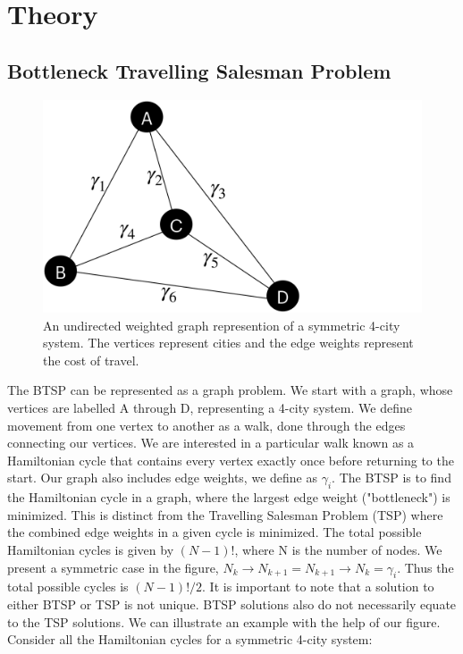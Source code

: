 \documentclass[twocolumn,showpacs,preprintnumbers,amsmath,amssymb]{revtex4}
\begin{document}
		
		\section{Theory}
		
		\subsection{Bottleneck Travelling Salesman Problem}
		
		\begin{figure}[!h]
			\centering
			\includegraphics[trim={0 0 21.9cm 0},clip, width=0.7 \linewidth]{"graphics/4-city"}
			\caption{An undirected weighted graph represention of a  symmetric 4-city system.  The vertices represent cities and the edge weights represent the cost of travel. }
			\label{fig:4-city-graphic}
		\end{figure}		
		
		The BTSP can be represented as a graph problem.  We start with a graph, whose vertices are labelled A through D, representing a 4-city system. We define movement from one vertex to another as a walk, done through the edges connecting our vertices. We are interested in a particular walk known as a Hamiltonian cycle that contains every vertex exactly once before returning to the start. Our graph also includes edge weights, we define as $ \gamma_i $.
		The BTSP is to find the Hamiltonian cycle in a graph, where the largest edge weight ("bottleneck") is minimized. This is distinct from the Travelling Salesman Problem (TSP) where the combined edge weights in a given cycle is minimized. The total possible Hamiltonian cycles is given by $(N-1)!$, where N is the number of nodes. We present a symmetric case in the figure,  $N_k \rightarrow N_{k+1} = N_{k+1} \rightarrow N_{k} = \gamma_i$. Thus the total possible cycles is  $(N-1)!/2$.  It is important to note that a solution to either BTSP or TSP is not unique. BTSP solutions also do not necessarily equate to the TSP solutions. We can illustrate an example with the help of our figure. Consider all the Hamiltonian cycles for a symmetric 4-city system:
		
\end{document}

